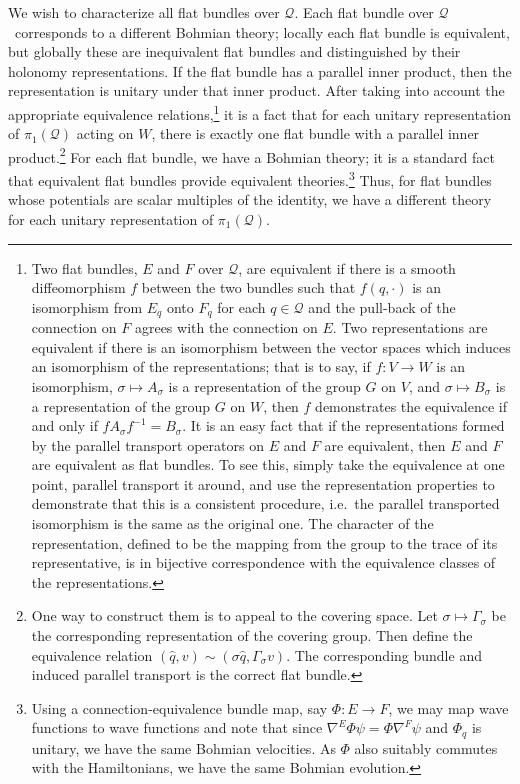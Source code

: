 \documentclass[11pt]{article}
\theoremstyle{remark}
\begin{document}
We wish to 
characterize all  
 flat bundles over
\ensuremath{\mathcal{Q}}. Each flat bundle over
\ensuremath{\mathcal{Q}}\ corresponds to a different 
Bohmian theory; locally each flat bundle is equivalent, but globally
these are inequivalent flat  bundles and distinguished by their
holonomy representations.
If the flat bundle has a parallel inner
product,  then the representation is unitary under that inner product.  
After taking into account the appropriate equivalence
relations,\footnote{
Two flat bundles, $E$ and $F$  over \ensuremath{\mathcal{Q}}, are equivalent if there
is a smooth 
diffeomorphism $f$ between 
the two bundles such that $f(\ensuremath{q}, \cdot)$ is an isomorphism from
$E_{\ensuremath{q}}$ onto $F_{\ensuremath{q}}$ for
each $\ensuremath{q} \in \ensuremath{\mathcal{Q}}$ and  the pull-back of the
connection on $F$ agrees
with the connection on $E$. Two representations are equivalent if
there is an isomorphism between the vector spaces which induces an
isomorphism of the representations; that is to say, if $f: V \to W$ is
an isomorphism, $\ensuremath{\sigma} \mapsto A_{\ensuremath{\sigma}}$ is a representation of the
group $G$ on $V$, and $\ensuremath{\sigma} \mapsto B_{\ensuremath{\sigma}}$ is a representation of the
group $G$ on $W$, then $f$ demonstrates the equivalence  if and
only if $f A_\ensuremath{\sigma} f^{-1} = B_{\ensuremath{\sigma}}$. It is an easy fact that if
the representations formed by the parallel transport operators on $E$
and $F$ are
equivalent, then $E$ and $F$ are equivalent as flat bundles. To see
this, simply take the equivalence at one point, parallel
transport it around, and use the representation properties to
demonstrate that this is a consistent procedure, i.e.\ the parallel
transported isomorphism is the same as the original one. The character
of the representation, defined to be the mapping from the group to the
trace of its representative, is in bijective correspondence with the
equivalence classes of the representations. 
}
it is a fact
that for each unitary representation of \ensuremath{\pi_1 ({\ensuremath{\mathcal{Q}}})} acting on $W$, there is
exactly one flat 
bundle with a parallel inner product.\footnote{One way to construct
them is to appeal to the covering space. Let $\ensuremath{\sigma} \mapsto \ensuremath{\Gamma_{\ensuremath{\sigma}}}$ be the
corresponding representation of the covering group. Then define the
equivalence relation $(\ensuremath{\hat{q}}, v) \ensuremath{\sim}
   (\ensuremath{\sigma} \ensuremath{\hat{q}}, \ensuremath{\Gamma_{\ensuremath{\sigma}}} v)$. The corresponding bundle and induced
parallel transport is the correct flat bundle.}
 For each flat bundle,
we have a Bohmian theory; it is a standard fact that equivalent flat bundles
provide equivalent theories.\footnote{Using a connection-equivalence
bundle map, say $\Phi: E \to F$, we may map wave functions to wave functions and note that since
$\nabla^E \Phi \ensuremath{\psi} = \Phi \nabla^F \ensuremath{\psi}$ and $\Phi_{\ensuremath{q}}$ is
unitary, we have the same Bohmian velocities. As $\Phi$ also suitably commutes
with the Hamiltonians, we have the same Bohmian evolution. 
} Thus, for flat bundles whose potentials are scalar
multiples of the identity, we have a different theory for each unitary
representation of \ensuremath{\pi_1 ({\ensuremath{\mathcal{Q}}})}.
\end{document}
